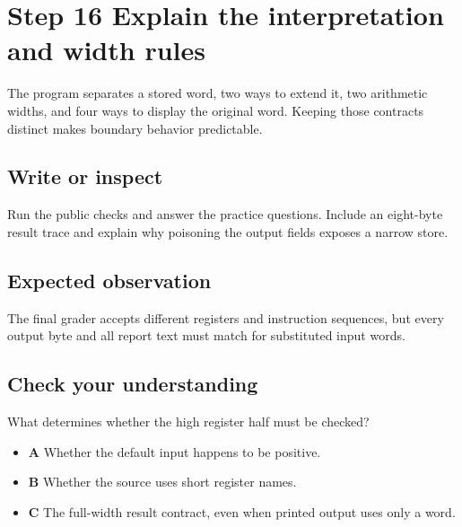 \section{Step 16 Explain the interpretation and width
  rules}\label{004-bit-inspector-s16-step-16-explain-the-interpretation-and-width-rules}

The program separates a stored word, two ways to extend it, two
arithmetic widths, and four ways to display the original word. Keeping
those contracts distinct makes boundary behavior predictable.

\subsection{Write or
  inspect}\label{004-bit-inspector-s16-write-or-inspect}

Run the public checks and answer the practice questions. Include an
eight-byte result trace and explain why poisoning the output fields
exposes a narrow store.

\subsection{Expected
  observation}\label{004-bit-inspector-s16-expected-observation}

The final grader accepts different registers and instruction sequences,
but every output byte and all report text must match for substituted
input words.

\subsection{Check your
  understanding}\label{004-bit-inspector-s16-check-your-understanding}

What determines whether the high register half must be checked?

\begin{itemize}
  \tightlist
  \item
        \textbf{A} Whether the default input happens to be positive.
  \item
        \textbf{B} Whether the source uses short register names.
  \item
        \textbf{C} The full-width result contract, even when printed output
        uses only a word.
\end{itemize}
